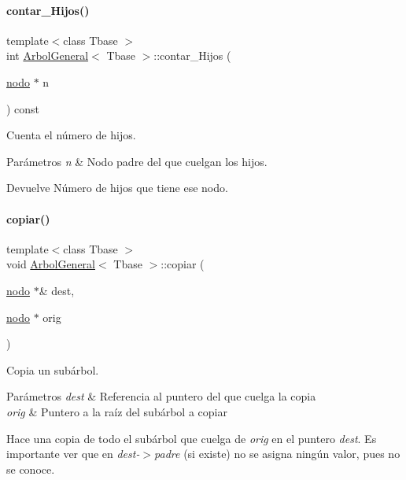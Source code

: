 \paragraph{\texorpdfstring{contar\+\_\+\+Hijos()}{contar\_Hijos()}}
{\footnotesize\ttfamily template$<$class Tbase $>$ \\
int \hyperlink{classArbolGeneral}{Arbol\+General}$<$ Tbase $>$\+::contar\+\_\+\+Hijos (\begin{DoxyParamCaption}\item[{\hyperlink{structArbolGeneral_1_1nodo}{nodo} $\ast$}]{n }\end{DoxyParamCaption}) const\hspace{0.3cm}{\ttfamily [private]}}



Cuenta el número de hijos. 


\begin{DoxyParams}{Parámetros}
{\em n} & Nodo padre del que cuelgan los hijos. \\
\hline
\end{DoxyParams}
\begin{DoxyReturn}{Devuelve}
Número de hijos que tiene ese nodo. 
\end{DoxyReturn}
\hypertarget{classArbolGeneral_a79f31cbba599abea7ab8b2f4ac7bef91}{}\label{classArbolGeneral_a79f31cbba599abea7ab8b2f4ac7bef91} 
\paragraph{\texorpdfstring{copiar()}{copiar()}}
{\footnotesize\ttfamily template$<$class Tbase $>$ \\
void \hyperlink{classArbolGeneral}{Arbol\+General}$<$ Tbase $>$\+::copiar (\begin{DoxyParamCaption}\item[{\hyperlink{structArbolGeneral_1_1nodo}{nodo} $\ast$\&}]{dest,  }\item[{\hyperlink{structArbolGeneral_1_1nodo}{nodo} $\ast$}]{orig }\end{DoxyParamCaption})\hspace{0.3cm}{\ttfamily [private]}}



Copia un subárbol. 


\begin{DoxyParams}{Parámetros}
{\em dest} & Referencia al puntero del que cuelga la copia \\
\hline
{\em orig} & Puntero a la raíz del subárbol a copiar\\
\hline
\end{DoxyParams}
Hace una copia de todo el subárbol que cuelga de {\itshape orig} en el puntero {\itshape dest}. Es importante ver que en {\itshape dest-\/$>$padre} (si existe) no se asigna ningún valor, pues no se conoce. \hypertarget{classArbolGeneral_aba5f46f715343b9ee4952c30da065f8f}{}\label{classArbolGeneral_aba5f46f715343b9ee4952c30da065f8f} 
